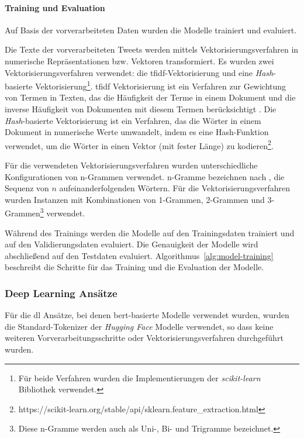 \paragraph{Training und Evaluation}
Auf Basis der vorverarbeiteten Daten wurden die Modelle trainiert und evaluiert.

Die Texte der vorverarbeiteten Tweets werden mittels Vektorisierungsverfahren in numerische Repräsentationen bzw. Vektoren transformiert.
Es wurden zwei Vekto\-risierungs\-verfahren verwendet: die \gls{tfidf}-Vek\-to\-ri\-sie\-rung und eine \textit{Hash}-basierte Vektorisierung\footnote{Für beide Verfahren wurden die Implementierungen der \textit{scikit-learn} Bibliothek verwendet.}.
\gls{tfidf} Vektorisierung ist ein Verfahren zur Gewichtung von Termen in Texten, das die Häufigkeit der Terme in einem Dokument und die inverse Häufigkeit von Dokumenten mit diesem Termen berücksichtigt \cite[S. 119]{manning2009introduction}.
Die \textit{Hash}-basierte Vektorisierung ist ein Verfahren, das die Wörter in einem Dokument in numerische Werte umwandelt, indem es eine Hash-Funktion verwendet, um die Wörter in einen Vektor (mit fester Länge) zu kodieren\footnote{https://scikit-learn.org/stable/api/sklearn.feature\_extraction.html}.

Für die verwendeten Vektorisierungsverfahren wurden unterschiedliche Konfigurationen von n-Grammen verwendet.
n-Gramme bezeichnen nach \cite[S.33]{jm3}, die Sequenz von $n$ aufeinanderfolgenden Wörtern.
Für die Vektorisierungsverfahren wurden Instanzen mit Kombinationen von 1-Grammen, 2-Grammen und 3-Grammen\footnote{Diese n-Gramme werden auch als Uni-, Bi- und Trigramme bezeichnet.} verwendet.

Während des Trainings werden die Modelle auf den Trainingsdaten trainiert und auf den Validierungsdaten evaluiert.
Die Genauigkeit der Modelle wird abschließend auf den Testdaten evaluiert.
Algorithmus~\ref{alg:model-training} beschreibt die Schritte für das Training und die Evaluation der Modelle.

\subsubsection{Deep Learning Ansätze} \label{sec:deep-learning-ansaetze}

Für die \gls{dl} Ansätze, bei denen \gls{bert}-basierte Modelle verwendet wurden, wurden die Standard-Tokenizer der \textit{Hugging Face} Modelle verwendet, so dass keine weiteren Vorverarbeitungsschritte oder Vektorisierungsverfahren durchgeführt wurden.

